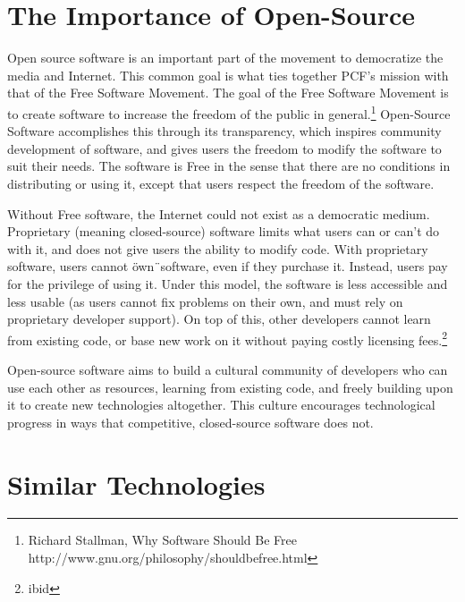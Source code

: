 \documentclass[a4paper,12pt]{report}
\begin{document}
\section {The Importance of Open-Source}
Open source software is an important part of the movement to democratize the media and Internet. 
This common goal is what ties together PCF's mission with that of the Free Software Movement. 
The goal of the Free Software Movement is to create software to increase the freedom of the public in general.\footnote{Richard Stallman, Why Software Should Be Free http://www.gnu.org/philosophy/shouldbefree.html}
Open-Source Software accomplishes this through its transparency, which inspires community development of software, and gives users the freedom to modify the software to suit their needs.
The software is Free in the sense that there are no conditions in distributing or using it, except that users respect the freedom of the software.


Without Free software, the Internet could not exist as a democratic medium.
Proprietary (meaning closed-source) software limits what users can or can't do with it, and does not give users the ability to modify code.
With proprietary software, users cannot \"own\"\ software, even if they purchase it.
Instead, users pay for the privilege of using it.
Under this model, the software is less accessible and less usable (as users cannot fix problems on their own, and must rely on proprietary developer support).
On top of this, other developers cannot learn from existing code, or base new work on it without paying costly licensing fees.\footnote{ibid} 


Open-source software aims to build a cultural community of developers who can use each other as resources, learning from existing code, and freely building upon it to create new technologies altogether.
This culture encourages technological progress in ways that competitive, closed-source software does not. 


\section {Similar Technologies}
\end{document}
